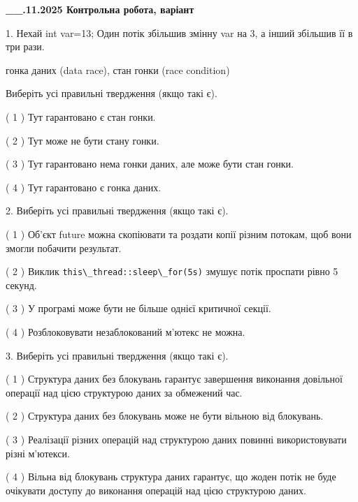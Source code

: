 \documentclass[12pt, ukrainian]{article}
\def\code#1{\Verb!#1!}
\begin{document}
\newpage
\begin {large}

\textbf{\_\_.11.2025 Контрольна робота, варіант  }\par


{
1. Нехай int var=13; Один потік збільшив змінну var на 3, а інший збільшив її в три рази.

гонка даних (data race), стан гонки (race condition)

Виберіть усі правильні твердження (якщо такі є).\par
\vspace{2mm}
( 1 ) Тут гарантовано є стан гонки.%

( 2 ) Тут може не бути стану гонки.%

( 3 ) Тут гарантовано нема гонки даних, але може бути стан гонки.%

( 4 ) Тут гарантовано є гонка даних.%


2. Виберіть усі правильні твердження (якщо такі є).\par
\vspace{2mm}

( 1 ) Об’єкт future можна скопіювати та роздати копії різним потокам, щоб вони змогли побачити результат.%

( 2 ) Виклик \code{this\_thread::sleep\_for(5s)} змушує потік проспати рівно 5 секунд.%

( 3 ) У програмі може бути не більше однієї критичної секції.%

( 4 ) Розблоковувати незаблокований м’ютекс не можна.%


3. Виберіть усі правильні твердження (якщо такі є).\par
\vspace{2mm}

( 1 ) Структура даних без блокувань гарантує завершення виконання довільної операції над цією структурою даних за обмежений час.%

( 2 ) Структура даних без блокувань може не бути вільною від блокувань.%

( 3 ) Реалізації різних операцій над структурою даних повинні використовувати різні м’ютекси.%

( 4 ) Вільна від блокувань структура даних гарантує, що жоден потік не буде очікувати доступу до виконання операцій над цією структурою даних.%


}
\end{large}
\end{document}
